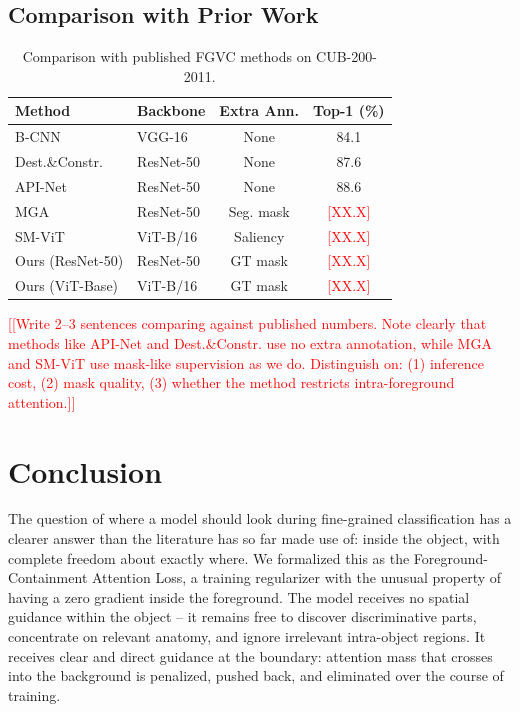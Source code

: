 \documentclass[journal]{IEEEtran}
\newcommand{\ph}[1]{\textcolor{red}{[#1]}}
\begin{document}
\subsection{Comparison with Prior Work}

\begin{table}[htbp]
  \centering
  \caption{Comparison with published FGVC methods on CUB-200-2011.}
  \label{tab:sota}
  \renewcommand{\arraystretch}{1.2}
  \begin{tabular}{l l c c}
    \toprule
    \textbf{Method} & \textbf{Backbone}
      & \textbf{Extra Ann.} & \textbf{Top-1 (\%)} \\
    \midrule
    B-CNN~\cite{lin2015bilinear}           & VGG-16    & None      & 84.1 \\
    Dest.\&Constr.~\cite{zheng2019looking} & ResNet-50 & None      & 87.6 \\
    API-Net~\cite{zhuang2020learning}      & ResNet-50 & None      & 88.6 \\
    MGA~\cite{wang2021mga}                 & ResNet-50 & Seg. mask & \ph{XX.X} \\
    SM-ViT~\cite{smvit2023}                & ViT-B/16  & Saliency  & \ph{XX.X} \\
    \midrule
    Ours (ResNet-50) & ResNet-50 & GT mask   & \ph{XX.X} \\
    Ours (ViT-Base)  & ViT-B/16  & GT mask   & \ph{XX.X} \\
    \bottomrule
  \end{tabular}
\end{table}

\ph{[Write 2--3 sentences comparing against published numbers.
Note clearly that methods like API-Net and Dest.\&Constr. use
no extra annotation, while MGA and SM-ViT use mask-like supervision
as we do. Distinguish on: (1) inference cost, (2) mask quality,
(3) whether the method restricts intra-foreground attention.]}


\section{Conclusion}
\label{sec:conclusion}

The question of where a model should look during fine-grained
classification has a clearer answer than the literature has
so far made use of: inside the object, with complete freedom
about exactly where. We formalized this as the Foreground-Containment
Attention Loss, a training regularizer with the unusual property
of having a zero gradient inside the foreground. The model
receives no spatial guidance within the object -- it remains
free to discover discriminative parts, concentrate on relevant
anatomy, and ignore irrelevant intra-object regions. It receives
clear and direct guidance at the boundary: attention mass that
crosses into the background is penalized, pushed back, and
eliminated over the course of training.
\end{document}

